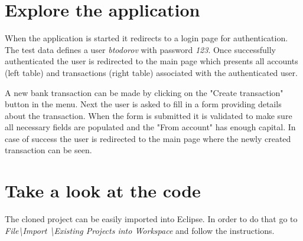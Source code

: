 \documentclass[a4paper, notitlepage]{article}
\begin{document}
\section{Explore the application}

When the application is started it redirects to a login page for authentication. The test data defines a user \textit{btodorov} with password \textit{123}. Once successfully authenticated the user is redirected to the main page which presents all accounts (left table) and transactions (right table) associated with the authenticated user. 

A new bank transaction can be made by clicking on the "Create transaction" button in the menu. Next the user is asked to fill in a form providing details about the transaction. When the form is submitted it is validated to make sure all necessary fields are populated and the "From account" has enough capital. In case of success the user is redirected to the main page where the newly created transaction can be seen. 

\section{Take a look at the code}
The cloned project can be easily imported into Eclipse. In order to do that go to \textit{File\textbackslash Import \textbackslash Existing Projects into Workspace} and follow the instructions.
\end{document}
